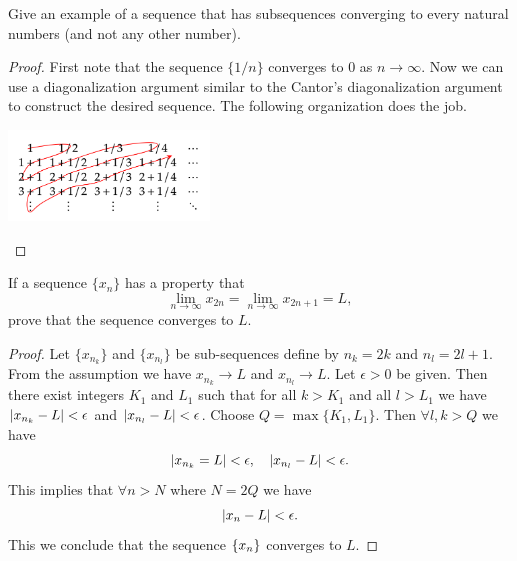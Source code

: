  \begin{problem}
 	Give an example of a sequence that has subsequences converging to every natural numbers (and not any other number).
 \end{problem}
 \begin{proof}
 	First note that the sequence $\{1/n\}$ converges to 0 as $n\to\infty$. Now we can use a diagonalization argument similar to the Cantor's diagonalization argument to construct the desired sequence. The following organization does the job.
 	\begin{center}
 		 \includegraphics[width=0.4\textwidth]{Images/diagSequence.png}
 	\end{center}

 \end{proof}
 
 \begin{problem}
 	If a sequence $\{x_n\}$ has a property that 
 	\[ \lim_{n\to\infty} x_{2n} = \lim_{n\to\infty}x_{2n+1} = L,  \]
 	prove that the sequence converges to $L$.
 \end{problem}
 \begin{proof}
 	Let $\{x_{n_k}\}$ and $\{x_{n_l}\}$ be sub-sequences define by $n_k = 2k$ and $n_l = 2l+1$. From the assumption we have $x_{n_k} \to L$ and $x_{n_l}\to L$.
 	Let $\epsilon>0$ be given. Then there exist integers $K_1$ and $L_1$ such that for all $k>K_1$ and all $l > L_1$ we have $|x_{n_k} - L| < \epsilon$ and $|x_{n_l} - L| < \epsilon$. Choose $Q = \max\{K_1, L_1\}$. Then $\forall l,k > Q$ we have
 	\[ |x_{n_k} = L| < \epsilon, \quad |x_{n_l} - L| < \epsilon. \]
 	This implies that $\forall n>N$ where $N = 2Q$ we have 
 	\[ |x_n - L| < \epsilon. \]
 	This we conclude that the sequence $\{x_n\}$ converges to $L$.
  \end{proof}
  


